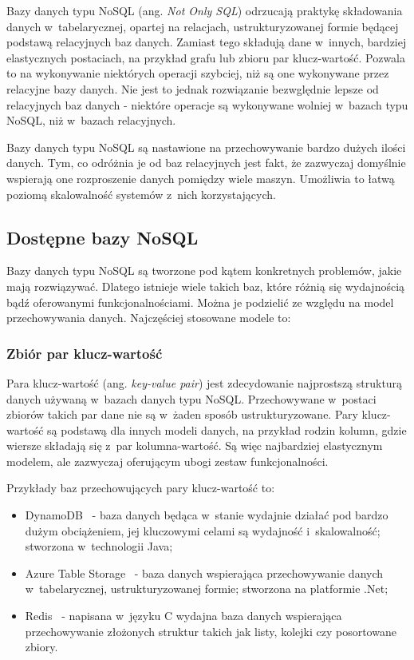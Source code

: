 Bazy danych typu NoSQL (ang. \emph{Not Only SQL}) odrzucają praktykę składowania danych w~tabelarycznej, opartej na relacjach, ustrukturyzowanej formie będącej podstawą relacyjnych baz danych.
Zamiast tego składują dane w~innych, bardziej elastycznych postaciach, na przykład grafu lub zbioru par klucz-wartość.
Pozwala to na wykonywanie niektórych operacji szybciej, niż są one wykonywane przez relacyjne bazy danych.
Nie jest to jednak rozwiązanie bezwględnie lepsze od relacyjnych baz danych - niektóre operacje są wykonywane wolniej w~bazach typu NoSQL, niż w~bazach relacyjnych.

Bazy danych typu NoSQL są nastawione na przechowywanie bardzo dużych ilości danych.
Tym, co odróżnia je od baz relacyjnych jest fakt, że zazwyczaj domyślnie wspierają one rozproszenie danych pomiędzy wiele maszyn.
Umożliwia to łatwą poziomą skalowalność systemów z~nich korzystających.


\subsection{Dostępne bazy NoSQL}

Bazy danych typu NoSQL są tworzone pod kątem konkretnych problemów, jakie mają rozwiązywać.
Dlatego istnieje wiele takich baz, które różnią się wydajnością bądź oferowanymi funkcjonalnościami.
Można je podzielić ze względu na model przechowywania danych.
Najczęściej stosowane modele to:

\subsubsection{Zbiór par klucz-wartość}

Para klucz-wartość (ang. \emph{key-value pair}) jest zdecydowanie najprostszą strukturą danych używaną w~bazach danych typu NoSQL.
Przechowywane w~postaci zbiorów takich par dane nie są w~żaden sposób ustrukturyzowane.
Pary klucz-wartość są podstawą dla innych modeli danych, na przykład rodzin kolumn, gdzie wiersze składają się z~par kolumna-wartość.
Są więc najbardziej elastycznym modelem, ale zazwyczaj oferującym ubogi zestaw funkcjonalności.

Przykłady baz przechowujących pary klucz-wartość to:

\begin{itemize}
 \item DynamoDB~\cite{dynamo_db} - baza danych będąca w~stanie wydajnie działać pod bardzo dużym obciążeniem, jej kluczowymi celami są wydajność i~skalowalność; stworzona w~technologii Java;
 \item Azure Table Storage~\cite{azure_table_storage} - baza danych wspierająca przechowywanie danych w~tabelarycznej, ustrukturyzowanej formie; stworzona na platformie .Net;
 \item Redis~\cite{redis} - napisana w~języku C wydajna baza danych wspierająca przechowywanie złożonych struktur takich jak listy, kolejki czy posortowane zbiory.
\end{itemize}

